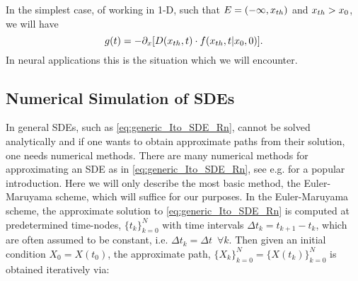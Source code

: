 In the simplest case, of working in 1-D, such that $E = (-\infty, { x_{th} })$ and
${ x_{th} }>x_0$, we will have 
$$  g(t) = -{\partial}_x[ D({ x_{th} },t) \cdot f({ x_{th} },t|x_0,0)].$$ 
In neural applications this is the situation which we will encounter.

% 
% 


\subsection{Numerical Simulation of SDEs}
In general SDEs, such as \cref{eq:generic_Ito_SDE_Rn}, cannot be solved
analytically and if one wants to obtain approximate paths from their solution,
one needs numerical methods. There are many numerical methods for approximating
an SDE as in \cref{eq:generic_Ito_SDE_Rn}, see e.g. \cite{Higham2001} for a
popular introduction. Here we will only describe the most basic method, the
Euler-Maruyama scheme, which will suffice for our purposes. In the
Euler-Maruyama scheme, the approximate solution to \cref{eq:generic_Ito_SDE_Rn}
is computed at predetermined time-nodes, $\{t_k\}_{k=0}^N$ with time intervals
$\Delta t_k = t_{k+1} - t_{k }$, which are often assumed to be constant, i.e.
$\Delta t_k = \Delta t\,\,\, \forall k$. Then given an initial condition $X_0 =
X(t_0)$, the approximate path, $\{X_k\}_{k=0}^N = \{X(t_k)\}_{k=0}^N$ is
obtained iteratively via:

